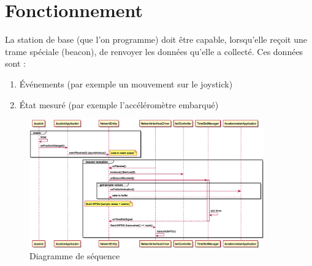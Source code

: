\documentclass[DeseNET_Sebastien_Deriaz]{subfiles}
\begin{document}
\section{Fonctionnement}
La station de base (que l'on programme) doit être capable, lorsqu'elle reçoit une trame spéciale (beacon), de renvoyer les données qu'elle a collecté. Ces données sont :
\begin{enumerate}
\item Événements (par exemple un mouvement sur le joystick)
\item État mesuré (par exemple l'accéléromètre embarqué)
\end{enumerate}
\begin{figure}[H]
\centering
\includegraphics[width=0.9\textwidth]{out/sequence_beacon.eps}
\caption{Diagramme de séquence}
\end{figure}
\pagebreak
\end{document}

